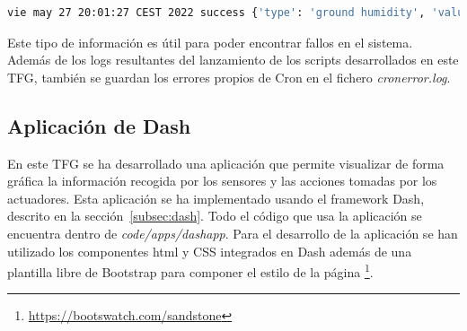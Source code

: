 \documentclass[a4paper, 12pt, oneside]{book}
\begin{document}
\begin{lstlisting}[language=Bash]
vie may 27 20:01:27 CEST 2022 success {'type': 'ground humidity', 'value': 0.2278, 'sensorID': 0, 'location': 'indoor', 'date': datetime.datetime(2022, 5, 27, 20, 1, 8, 24826), '_id': ObjectId('629111e4b2c6d1b9a5e7f23f')} 0.2209 {'type': 'ground humidity', 'value': 0.2209, 'sensorID': 1, 'location': 'indoor', 'date': datetime.datetime(2022, 5, 27, 20, 1, 13, 710340), '_id': ObjectId('629111e9b2c6d1b9a5e7f240')} 32.0 {'type': 'ambient humidity', 'value': 32.0, 'sensorID': 22, 'location': 'outdoor', 'date': datetime.datetime(2022, 5, 27, 20, 1, 15, 457495), '_id': ObjectId('629111ebb2c6d1b9a5e7f241')} 27.200000762939453 {'type': 'ambient humidity', 'value': 27.200000762939453, 'sensorID': 27, 'location': 'indoor', 'date': datetime.datetime(2022, 5, 27, 20, 1, 17, 203246), '_id': ObjectId('629111edb2c6d1b9a5e7f242')} 28.899999618530273 {'type': 'ambient temperature', 'value': 28.899999618530273, 'sensorID': 22, 'location': 'outdoor', 'date': datetime.datetime(2022, 5, 27, 20, 1, 21, 482673), '_id': ObjectId('629111f1b2c6d1b9a5e7f243')} 32.79999923706055 {'type': 'ambient temperature', 'value': 32.79999923706055, 'sensorID': 27, 'location': 'indoor', 'date': datetime.datetime(2022, 5, 27, 20, 1, 23, 239564), '_id': ObjectId('629111f3b2c6d1b9a5e7f244')} 33.0 {'type': 'ground temperature', 'value': 33.0, 'sensorID': '325a0f1e64ff', 'location': 'indoor', 'date': datetime.datetime(2022, 5, 27, 20, 1, 25, 179596), '_id': ObjectId('629111f5b2c6d1b9a5e7f245')} 27.625 {'type': 'ground temperature', 'value': 27.625, 'sensorID': '32360c1e64ff', 'location': 'indoor', 'date': datetime.datetime(2022, 5, 27, 20, 1, 27, 99572), '_id': ObjectId('629111f7b2c6d1b9a5e7f246')}
\end{lstlisting}

Este tipo de información es útil para poder encontrar fallos en el sistema. Además de los logs resultantes del lanzamiento de los scripts desarrollados en este TFG, también se guardan los errores propios de Cron en el fichero \textit{cronerror.log}.


\subsection{Aplicación de Dash}
\label{aplicacion de dash}
En este TFG se ha desarrollado una aplicación que permite visualizar de forma gráfica la información recogida por los sensores y las acciones tomadas por los actuadores. Esta aplicación se ha implementado usando el framework Dash, descrito en la sección~\ref{subsec:dash}.
Todo el código que usa la aplicación se encuentra dentro de \textit{code/apps/dashapp}.
Para el desarrollo de la aplicación se han utilizado los componentes html y CSS integrados en Dash además de una plantilla libre de Bootstrap para componer el estilo de la página \footnote{\url{https://bootswatch.com/sandstone}}.
\end{document}
